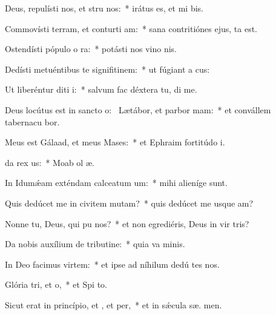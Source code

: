 \item Deus, repulísti nos, et stru nos:~* irátus es, et mi  bis.
\item Commovísti terram, et conturti am:~* sana contritiónes ejus,  ta est.
\item Ostendísti pópulo o ra:~* potásti nos vino nis.
\item Dedísti metuéntibus te signifitinem:~* ut fúgiant a  cus:
\item Ut liberéntur diti i:~* salvum fac déxtera tu,  di me.
\item Deus locútus est in sancto o:~\pscross{} Lætábor, et parbor mam:~* et convállem tabernacu bor.
\item Meus est Gálaad, et meus  Mases:~* et Ephraim fortitúdo  i.
\item {}da rex us:~* Moab ol  æ.
\item In Idumǽam exténdam calceatum um:~* mihi alieníge  sunt.
\item Quis dedúcet me in civitem mutam?~* quis dedúcet me usque  am?
\item Nonne tu, Deus, qui pu nos?~* et non egrediéris, Deus in vir tris?
\item Da nobis auxílium de tributine:~* quia va  minis.
\item In Deo facimus virtem:~* et ipse ad níhilum dedú tes nos.
\item Glória tri, et o,~* et Spi to.
\item Sicut erat in princípio, et , et per,~* et in sǽcula sæ. men.
